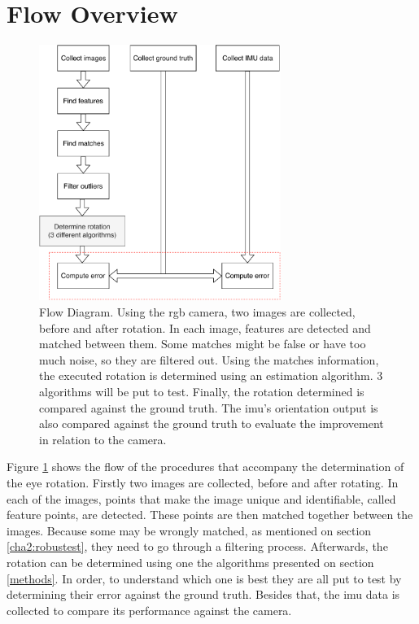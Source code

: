 \section{Flow Overview}
\begin{figure}[ht]
	\centering
	\includegraphics[width=0.7\textwidth]{images/approach.pdf}
	\caption[Flow Diagram]{Flow Diagram. Using the \acrshort{rgb} camera, two images are collected, before and after rotation. In each image, features are detected and matched between them. Some matches might be false or have too much noise, so they are filtered out. Using the matches information, the executed rotation is determined using an estimation algorithm. 3 algorithms will be put to test. Finally, the rotation determined is compared against the ground truth. The \acrshort{imu}'s orientation output is also compared against the ground truth to evaluate the improvement in relation to the camera.}
	\label{cha3:methodology:approach}
\end{figure}
Figure \ref{cha3:methodology:approach} shows the flow of the procedures that accompany the determination of the eye rotation. Firstly two images are collected, before and after rotating. In each of the images, points that make the image unique and identifiable, called feature points, are detected. These points are then matched together between the images. Because some may be wrongly matched, as mentioned on section \ref{cha2:robustest}, they need to go through a filtering process. Afterwards, the rotation can be determined using one the algorithms presented on section \ref{methods}. In order, to understand which one is best they are all put to test by determining their error against the ground truth. Besides that, the \acrshort{imu} data is collected to compare its performance against the camera.\\

